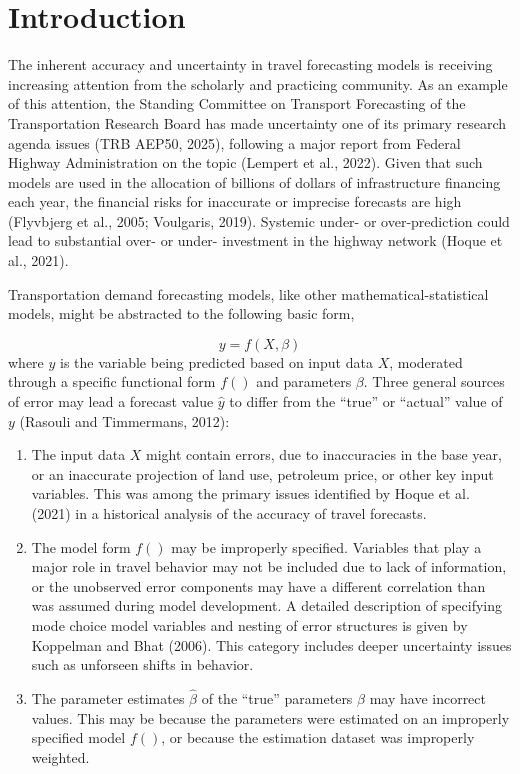 \documentclass[
  futuretransp,
  submit,
  moreauthors,
]{Definitions/mdpi}
\providecommand{\tightlist}{%
  \setlength{\itemsep}{0pt}\setlength{\parskip}{0pt}}
\begin{document}
\section{Introduction}\label{introduction}

The inherent accuracy and uncertainty in travel forecasting models is
receiving increasing attention from the scholarly and practicing
community. As an example of this attention, the Standing Committee on 
Transport Forecasting of the Transportation Research Board has made uncertainty
one of its primary research agenda issues (TRB AEP50, 2025), following a major report from 
Federal Highway Administration on the topic (Lempert et al., 2022).
Given that such models are used in the allocation of billions
of dollars of infrastructure financing each year, the financial risks
for inaccurate or imprecise forecasts are high (Flyvbjerg et al., 2005;
Voulgaris, 2019). Systemic under- or over-prediction could lead to substantial
over- or under- investment in the highway network (Hoque et al., 2021).

Transportation demand forecasting models, like other
mathematical-statistical models, might be abstracted to the following
basic form,

\[
y = f(X, \beta)
\]where \(y\) is the variable being predicted based on input data \(X\),
moderated through a specific functional form \(f()\) and parameters
\(\beta\). Three general sources of error may lead a forecast value
\(\hat{y}\) to differ from the ``true'' or ``actual'' value of \(y\)
(Rasouli and Timmermans, 2012):

\begin{enumerate}
\def\labelenumi{\arabic{enumi}.}
\tightlist
\item
  The input data \(X\) might contain errors, due to inaccuracies in the
  base year, or an inaccurate projection of land use, petroleum price,
  or other key input variables. This was among the primary issues
  identified by Hoque et al. (2021) in a historical analysis of the
  accuracy of travel forecasts.
\item
  The model form \(f()\) may be improperly specified. Variables that
  play a major role in travel behavior may not be included due to lack
  of information, or the unobserved error components may have a
  different correlation than was assumed during model development. A
  detailed description of specifying mode choice model variables and
  nesting of error structures is given by Koppelman and Bhat (2006). This
  category includes deeper uncertainty issues such as unforseen shifts
  in behavior.
\item
  The parameter estimates \(\hat{\beta}\) of the ``true'' parameters
  \(\beta\) may have incorrect values. This may be because the
  parameters were estimated on an improperly specified model \(f()\), or
  because the estimation dataset was improperly weighted.
\end{enumerate}
\end{document}
